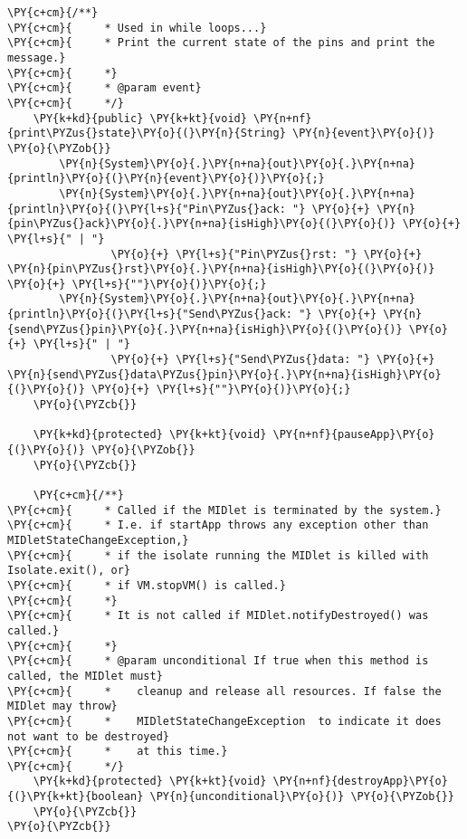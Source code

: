 \begin{Verbatim}[commandchars=\\\{\}]
    \PY{c+cm}{/**}
\PY{c+cm}{     * Used in while loops...}
\PY{c+cm}{     * Print the current state of the pins and print the message.}
\PY{c+cm}{     *}
\PY{c+cm}{     * @param event}
\PY{c+cm}{     */}
    \PY{k+kd}{public} \PY{k+kt}{void} \PY{n+nf}{print\PYZus{}state}\PY{o}{(}\PY{n}{String} \PY{n}{event}\PY{o}{)} \PY{o}{\PYZob{}}
        \PY{n}{System}\PY{o}{.}\PY{n+na}{out}\PY{o}{.}\PY{n+na}{println}\PY{o}{(}\PY{n}{event}\PY{o}{)}\PY{o}{;}
        \PY{n}{System}\PY{o}{.}\PY{n+na}{out}\PY{o}{.}\PY{n+na}{println}\PY{o}{(}\PY{l+s}{"Pin\PYZus{}ack: "} \PY{o}{+} \PY{n}{pin\PYZus{}ack}\PY{o}{.}\PY{n+na}{isHigh}\PY{o}{(}\PY{o}{)} \PY{o}{+} \PY{l+s}{" | "}
                \PY{o}{+} \PY{l+s}{"Pin\PYZus{}rst: "} \PY{o}{+} \PY{n}{pin\PYZus{}rst}\PY{o}{.}\PY{n+na}{isHigh}\PY{o}{(}\PY{o}{)} \PY{o}{+} \PY{l+s}{""}\PY{o}{)}\PY{o}{;}
        \PY{n}{System}\PY{o}{.}\PY{n+na}{out}\PY{o}{.}\PY{n+na}{println}\PY{o}{(}\PY{l+s}{"Send\PYZus{}ack: "} \PY{o}{+} \PY{n}{send\PYZus{}pin}\PY{o}{.}\PY{n+na}{isHigh}\PY{o}{(}\PY{o}{)} \PY{o}{+} \PY{l+s}{" | "}
                \PY{o}{+} \PY{l+s}{"Send\PYZus{}data: "} \PY{o}{+} \PY{n}{send\PYZus{}data\PYZus{}pin}\PY{o}{.}\PY{n+na}{isHigh}\PY{o}{(}\PY{o}{)} \PY{o}{+} \PY{l+s}{""}\PY{o}{)}\PY{o}{;}
    \PY{o}{\PYZcb{}}

    \PY{k+kd}{protected} \PY{k+kt}{void} \PY{n+nf}{pauseApp}\PY{o}{(}\PY{o}{)} \PY{o}{\PYZob{}}
    \PY{o}{\PYZcb{}}

    \PY{c+cm}{/**}
\PY{c+cm}{     * Called if the MIDlet is terminated by the system.}
\PY{c+cm}{     * I.e. if startApp throws any exception other than MIDletStateChangeException,}
\PY{c+cm}{     * if the isolate running the MIDlet is killed with Isolate.exit(), or}
\PY{c+cm}{     * if VM.stopVM() is called.}
\PY{c+cm}{     *}
\PY{c+cm}{     * It is not called if MIDlet.notifyDestroyed() was called.}
\PY{c+cm}{     *}
\PY{c+cm}{     * @param unconditional If true when this method is called, the MIDlet must}
\PY{c+cm}{     *    cleanup and release all resources. If false the MIDlet may throw}
\PY{c+cm}{     *    MIDletStateChangeException  to indicate it does not want to be destroyed}
\PY{c+cm}{     *    at this time.}
\PY{c+cm}{     */}
    \PY{k+kd}{protected} \PY{k+kt}{void} \PY{n+nf}{destroyApp}\PY{o}{(}\PY{k+kt}{boolean} \PY{n}{unconditional}\PY{o}{)} \PY{o}{\PYZob{}}
    \PY{o}{\PYZcb{}}
\PY{o}{\PYZcb{}}
\end{Verbatim}

